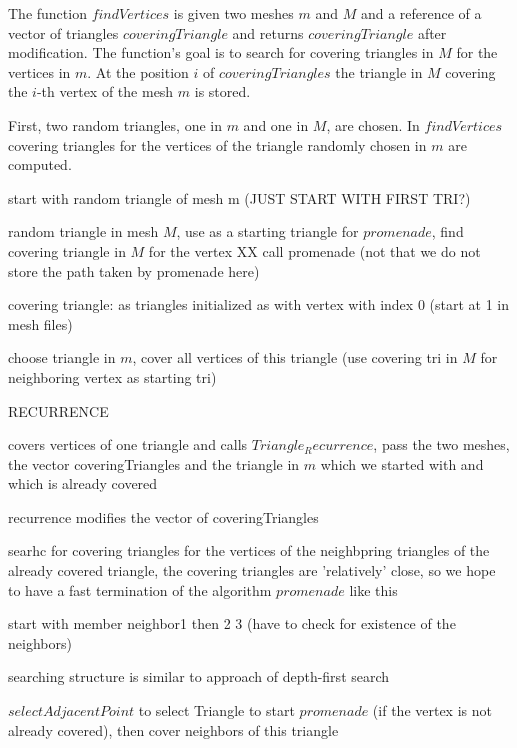\documentclass[10pt]{article}
\begin{document}
The function $ findVertices$ is given two meshes $m$ and $M$ and a reference of a vector of triangles $coveringTriangle$ and returns $coveringTriangle$ after modification. The function's goal is to search for covering triangles in $M$ for the vertices in $m$. At the position $i$ of $coveringTriangles$ the triangle in $M$ covering the $i$-th vertex of the mesh $m$ is stored.

First, two random triangles, one in $m$ and one in $M$, are chosen. In $ findVertices$ covering triangles for the vertices of the triangle randomly chosen in $m$ are computed.

start with random triangle of mesh m (JUST START WITH FIRST TRI?)

random triangle in mesh $M$, use as a starting triangle for $promenade$, find covering triangle in $M$ for the vertex XX
call promenade (not that we do not store the path taken by promenade here)

covering triangle: as triangles initialized as with vertex with index 0 (start at 1 in mesh files)

choose triangle in $m$, cover all vertices of this triangle (use covering tri in $M$ for neighboring vertex as starting tri)

RECURRENCE

covers vertices of one triangle and calls $Triangle_Recurrence$, pass the two meshes, the vector coveringTriangles and the triangle in $m$ which we started with and which is already covered

recurrence modifies the vector of coveringTriangles

searhc for covering triangles for the vertices of the neighbpring triangles of the already covered triangle, the covering triangles are 'relatively' close, so we hope to have a fast termination of the algorithm $promenade$ like this

start with member neighbor1 then 2 3 (have to check for existence of the neighbors)

searching structure is similar to approach of depth-first search

$selectAdjacentPoint$ to select Triangle to start $promenade$ (if the vertex is not already covered), then cover neighbors of this triangle
\end{document}
